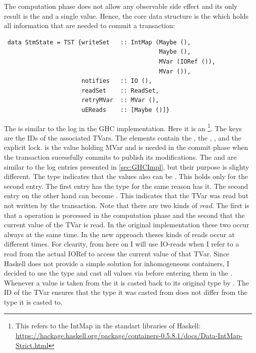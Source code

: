 The computation phase does not allow any observable side effect and its only result is the  and 
a single value.
Hence, the core data structure is the  which holds all information that are needed to commit a transaction:
\begin{lstlisting}
 data StmState = TST {writeSet   :: IntMap (Maybe (),
                                            Maybe (),
                                            MVar (IORef ()),
                                            MVar ()),
                      notifies   :: IO (),
                      readSet    :: ReadSet,
                      retryMVar  :: MVar (),
                      uEReads    :: [Maybe ()]}
\end{lstlisting}
The  is similar to the log in the GHC implementation. Here it is an  
\footnote{This refers to the IntMap in the standart libraries of Haskell: \url{https://hackage.haskell.org/package/containers-0.5.8.1/docs/Data-IntMap-Strict.html}}. 
The keys are the IDs of the associated TVars. The elements contain the ,
the , , and the explicit lock.  is the value holding 
MVar and is needed in the commit
phase when the transaction sucessfully commits to publish its modifications. The  
and  are similar to the log entries presented in \ref{sec:GHCImpl}, but their purpose is slighty 
different. The  type indicates that the values also can be . This holds
only for the second entry. The first entry has the  type for the same reason 
 has it. The second entry on the other hand can become . This indicates
that the TVar was read but not written by the transaction. Note that there are two kinds of 
\textit{read}. The first is that a  operation is porcessed in the computation phase
and the second that the current value of the TVar is read. In the original implementation these 
two occur always at the same time. In the new approach theses kinds of reads occur at different times.
For clearity, from here on I will use IO-reads when I refer to a read from the actual IORef to access
the current value of that TVar. Since Haskell does not provide a simple solution for inhomogeneous
containers, I decided to use the type \code{()} and cast all values via  before
entering them in the . Whenever a value is taken from the  it
is casted back to its original type by . The ID of the TVar ensures that 
the type it was casted from does not differ from the type it is casted to.

